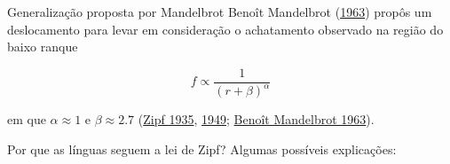 \documentclass[
  ignorenonframetext,
  aspectratio=169]{beamer}
\begin{document}
\begin{frame}{Generalização proposta por Mandelbrot}
\protect\hypertarget{generalizauxe7uxe3o-proposta-por-mandelbrot}{}
Benoît Mandelbrot (\protect\hyperlink{ref-mandelbrot1963}{1963}) propôs
um deslocamento para levar em consideração o achatamento observado na
região do baixo ranque

\[
f \propto \frac{1}{(r + \beta)^{\alpha}}
\]

em que \(\alpha \approx 1\) e \(\beta \approx 2.7\)
(\protect\hyperlink{ref-zipf1935}{Zipf 1935},
\protect\hyperlink{ref-zipf1949}{1949};
\protect\hyperlink{ref-mandelbrot1963}{Benoît Mandelbrot 1963}).
\end{frame}

\begin{frame}[allowframebreaks]{Por que as línguas seguem a lei de
Zipf?}
\protect\hypertarget{por-que-as-luxednguas-seguem-a-lei-de-zipf}{}
Algumas possíveis explicações:


\end{frame}
\end{document}
